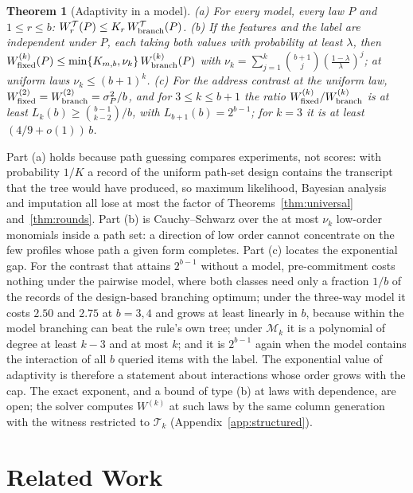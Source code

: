 \documentclass{article}
\newtheorem{theorem}{Theorem}
\begin{document}
\begin{theorem}[Adaptivity in a model]\label{thm:structured}
\textup{(a)} For every model, every law $P$ and $1\le r\le b$: $W^{\mathcal T}_r(P)\le K_r\,W^{\mathcal T}_{\rm branch}(P)$.
\textup{(b)} If the features and the label are independent under $P$, each taking both values with probability at least $\lambda$, then $W^{(k)}_{\rm fixed}(P)\le\min\{K_{m,b},\nu_k\}\,W^{(k)}_{\rm branch}(P)$ with $\nu_k=\sum_{j=1}^k\binom{b+1}j(\frac{1-\lambda}\lambda)^j$; at uniform laws $\nu_k\le(b+1)^k$.
\textup{(c)} For the address contrast at the uniform law, $W^{(2)}_{\rm fixed}=W^{(2)}_{\rm branch}=\sigma_P^2/b$, and for $3\le k\le b+1$ the ratio $W^{(k)}_{\rm fixed}/W^{(k)}_{\rm branch}$ is at least $L_k(b)\ge\binom{b-1}{k-2}/b$, with $L_{b+1}(b)=2^{b-1}$; for $k=3$ it is at least $(4/9+o(1))\,b$.
\end{theorem}
Part (a) holds because path guessing compares experiments, not scores: with probability $1/K$ a record of the uniform path-set design contains the transcript that the tree would have produced, so maximum likelihood, Bayesian analysis and imputation all lose at most the factor of Theorems~\ref{thm:universal} and~\ref{thm:rounds}. Part (b) is Cauchy--Schwarz over the at most $\nu_k$ low-order monomials inside a path set: a direction of low order cannot concentrate on the few profiles whose path a given form completes. Part (c) locates the exponential gap. For the contrast that attains $2^{b-1}$ without a model, pre-commitment costs nothing under the pairwise model, where both classes need only a fraction $1/b$ of the records of the design-based branching optimum; under the three-way model it costs $2.50$ and $2.75$ at $b=3,4$ and grows at least linearly in $b$, because within the model branching can beat the rule's own tree; under $\mathcal M_k$ it is a polynomial of degree at least $k-3$ and at most $k$; and it is $2^{b-1}$ again when the model contains the interaction of all $b$ queried items with the label. The exponential value of adaptivity is therefore a statement about interactions whose order grows with the cap. The exact exponent, and a bound of type (b) at laws with dependence, are open; the solver computes $W^{(k)}$ at such laws by the same column generation with the witness restricted to $\mathcal T_k$ (Appendix~\ref{app:structured}).



\section{Related Work}\label{sec:related}
\end{document}
